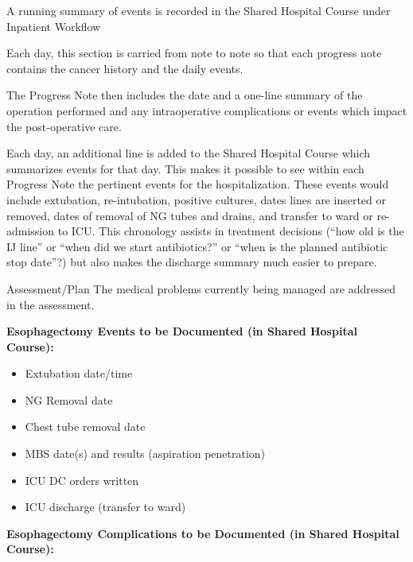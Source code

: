 \documentclass[
]{book}
\providecommand{\tightlist}{%
  \setlength{\itemsep}{0pt}\setlength{\parskip}{0pt}}
\begin{document}
A running summary of events is recorded in the Shared Hospital Course under Inpatient Workflow

Each day, this section is carried from note to note so that each progress note contains the cancer history and the daily events.

The Progress Note then includes the date and a one-line summary of the operation performed and any intraoperative complications or events which impact the post-operative care.

Each day, an additional line is added to the Shared Hospital Course which summarizes events for that day. This makes it possible to see within each Progress Note the pertinent events for the hospitalization. These events would include extubation, re-intubation, positive cultures, dates lines are inserted or removed, dates of removal of NG tubes and drains, and transfer to ward or re-admission to ICU. This chronology assists in treatment decisions (``how old is the IJ line'' or ``when did we start antibiotics?'' or ``when is the planned antibiotic stop date''?) but also makes the discharge summary much easier to prepare.

Assessment/Plan
The medical problems currently being managed are addressed in the assessment.

\textbf{Esophagectomy Events to be Documented (in Shared Hospital Course):}

\begin{itemize}
\tightlist
\item
  Extubation date/time
\item
  NG Removal date
\item
  Chest tube removal date
\item
  MBS date(s) and results (aspiration \textbar{} penetration)
\item
  ICU DC orders written
\item
  ICU discharge (transfer to ward)
\end{itemize}

\textbf{Esophagectomy Complications to be Documented (in Shared Hospital Course):}
\end{document}
